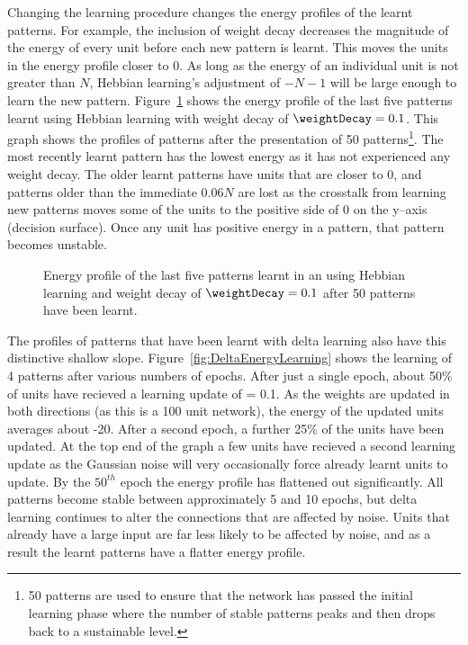 Changing the learning procedure changes the energy profiles of the learnt patterns. For example, the inclusion of weight decay decreases the magnitude of the energy of every unit before each new pattern is learnt.  This moves the units in the energy profile closer to 0.  As long as the energy of an individual unit is not greater than $N$, Hebbian learning's adjustment of $-N-1$  will be large enough to learn the new pattern.   Figure~\ref{fig:EnergyWeightDecay} shows the energy profile of the last five patterns learnt using Hebbian learning with weight decay of $\weightDecay = 0.1$.  This graph shows the profiles of patterns after the presentation of 50 patterns\footnote{50 patterns are used to ensure that the network has passed the initial learning phase where the number of stable patterns peaks and then drops back to a sustainable level.}.  The most recently learnt pattern has the lowest energy as it has not experienced any weight decay.  The older learnt patterns have units that are closer to 0, and patterns older than the immediate $0.06N$ are lost as the crosstalk from learning new patterns moves some of the units to the positive side of 0 on the y--axis (decision surface).  Once any unit has positive energy in a pattern, that pattern becomes unstable.  

\begin{figure}[tbp]
\center
\small
	
	\caption{Energy profile of the last five patterns learnt in an  using Hebbian learning and weight decay of $\weightDecay = 0.1$ after 50 patterns have been learnt.}
	\label{fig:EnergyWeightDecay}
\end{figure}

The profiles of patterns that have been learnt with delta learning also have this distinctive shallow slope.  Figure~\ref{fig:DeltaEnergyLearning} shows the learning of 4 patterns after various numbers of epochs.  After just a single epoch, about 50\% of units have recieved a learning update of \learningConst = 0.1.  As the weights are updated in both directions (as this is a 100 unit network), the energy of the updated units averages about -20.  After a second epoch, a further 25\% of the units have been updated.  At the top end of the graph a few units have recieved a second learning update as the Gaussian noise will very occasionally force already learnt units to update.  By the $50^{th}$ epoch the energy profile has flattened out significantly.  All patterns become stable between approximately 5 and 10 epochs, but delta learning continues to alter the connections that are affected by noise. Units that already have a large input are far less likely to be affected by noise, and as a result the learnt patterns have a flatter energy profile.

